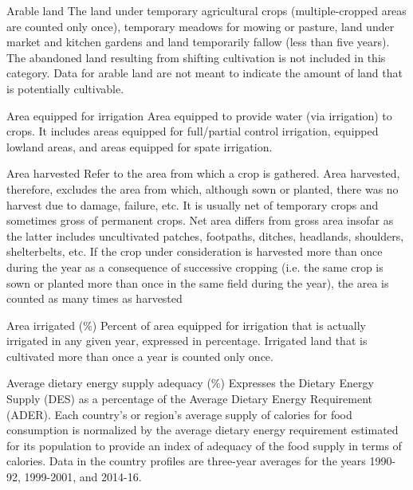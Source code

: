 \begin{MetadataCollection} {}
\begin{metadata}{Arable land} {}
The land under temporary agricultural crops (multiple-cropped areas are counted only once), temporary meadows for mowing or pasture, land under market and kitchen gardens and land temporarily fallow (less than five years). The abandoned land resulting from shifting cultivation is not included in this category. Data for arable land are not meant to indicate the amount of land that is potentially cultivable.
\end{metadata}

\begin{metadata}{Area equipped for irrigation} {}
Area equipped to provide water (via irrigation) to crops. It includes areas equipped for full/partial control irrigation, equipped lowland areas, and areas equipped for spate irrigation.
\end{metadata}

\begin{metadata}{Area harvested} {}
Refer to the area from which a crop is gathered. Area harvested, therefore, excludes the area from which, although sown or planted, there was no harvest due to damage, failure, etc. It is usually net of temporary crops and sometimes gross of permanent crops. Net area differs from gross area insofar as the latter includes uncultivated patches, footpaths, ditches, headlands, shoulders, shelterbelts, etc. If the crop under consideration is harvested more than once during the year as a consequence of successive cropping (i.e. the same crop is sown or planted more than once in the same field during the year), the area is counted as many times as harvested
\end{metadata}

\begin{metadata}{Area irrigated (\%)} {}
Percent of area equipped for irrigation that is actually irrigated in any given year, expressed in percentage. Irrigated land that is cultivated more than once a year is counted only once.
\end{metadata}

\begin{metadata}{Average dietary energy supply adequacy (\%)} {}
Expresses the Dietary Energy Supply (DES) as a percentage of the Average Dietary Energy Requirement (ADER). Each country's or region's average supply of calories for food consumption is normalized by the average dietary energy requirement estimated for its population to provide an index of adequacy of the food supply in terms of calories. Data in the country profiles are three-year averages for the years 1990-92, 1999-2001, and 2014-16.
\end{metadata}


\end{MetadataCollection}
